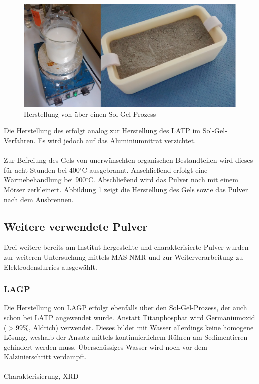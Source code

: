 \documentclass[a4paper, 11pt, headsepline,footsepline,twoside,abstract]{scrbook}
\begin{document}
\subsection{}
\begin{figure}
	\centering
	\includegraphics[width=1.0\columnwidth]{images/SolGel.jpg}
	\caption{Herstellung von  über einen Sol-Gel-Prozess}
	\label{sol_gel}
\end{figure}
Die Herstellung des  erfolgt analog zur Herstellung des LATP im Sol-Gel-Verfahren. Es wird jedoch auf das Aluminiumnitrat verzichtet.
\\\\
Zur Befreiung des Gels von unerwünschten organischen Bestandteilen wird dieses für acht Stunden bei 400$^\circ$C ausgebrannt. Anschließend erfolgt eine Wärmebehandlung bei 900$^\circ$C. Abschließend wird das Pulver noch mit einem Mörser zerkleinert. Abbildung \ref{sol_gel} zeigt die Herstellung des Gels sowie das Pulver nach dem Ausbrennen.
\subsection{Weitere verwendete Pulver}
\label{methodik_weitere_Pulver}
Drei weitere bereits am Institut hergestellte und charakterisierte Pulver wurden zur weiteren Untersuchung mittels MAS-NMR und zur Weiterverarbeitung zu Elektrodenslurries ausgewählt.  
\subsubsection{LAGP}
Die Herstellung von LAGP erfolgt ebenfalls über den Sol-Gel-Prozess, der auch schon bei LATP angewendet wurde. Anstatt Titanphosphat wird Germaniumoxid ($>99\%$, Aldrich) verwendet. Dieses bildet mit Wasser allerdings keine homogene Lösung, weshalb der Ansatz mittels kontinuierlichem Rühren am Sedimentieren gehindert werden muss. Überschüssiges Wasser wird noch vor dem Kalzinierschritt verdampft.
\\\\
Charakterisierung, XRD
\end{document}
